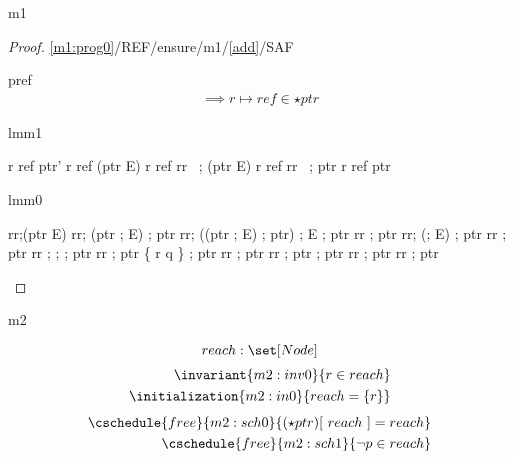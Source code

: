 \documentclass[12pt]{amsart}
\newcommand{\lookup}[2]{#1[#2]}
\begin{document}
\begin{machine}{m1}
\begin{proof}{\ref{m1:prog0}/REF/ensure/m1/\ref{add}/SAF}
\begin{free:var}{p}{ref}
\begin{align*}
{		\implies r \mapsto ref \in \star ptr }
\end{align*}
\easy
\begin{subproof}{lmm1}
\begin{calculation}
	r \mapsto ref \in \star ptr'
\hint{=}{ \eqref{m1:act0} }
	r \mapsto ref \in \star (ptr \bunion E)
	r \mapsto ref \in rr \, ; \star (ptr \bunion E)
\hint{=}{ \eqref{lmm0} }
	r \mapsto ref \in rr \, ; \star ptr
\hint{=}{ }
	r \mapsto ref \in \star ptr
\end{calculation}
\end{subproof}
\end{free:var}
\begin{subproof}{lmm0}
\begin{calculation}
	rr;\star (ptr \0\bunion E)
\hint{=}{ }
	rr; \star (\star ptr ; E) ; \star ptr
\hint{=}{ }
	rr; (\star (\star ptr ; E) ; \star ptr) ; E ; \star ptr 
	\2\bunion rr ; \star ptr
	rr; (\all ; E) ; \star ptr 
	\2\bunion rr ; \star ptr
\hint{=}{ }
	rr ; \all ;  ; \star ptr 
	\2\bunion rr ; \star ptr
\hint{\subseteq}{ }
	\{ r \mapsto q \} ; \star ptr 
	\2\bunion rr ; \star ptr
\hint{\subseteq}{ \eqref{m1:grd1} }
	rr ; \star ptr ; \star ptr 
	\2\bunion rr ; \star ptr
\hint{=}{ }
	rr ; \star ptr
\end{calculation}	
\end{subproof}
\end{proof}

\end{machine}

	

\begin{machine}{m2}

	\[ \variable{reach : \set[Node]} \]
\begin{align}
	\invariant{m2:inv0}{ r \in reach } \\
	\initialization{m2:in0}{ reach = \{r\} }
\end{align}
\begin{align}
	\cschedule{free}{m2:sch0}
		{ \lookup{(\star ptr)}{~reach~} = reach } \\
	\cschedule{free}{m2:sch1}{ \neg p \in reach }
\end{align}

\end{machine}
\end{document}
